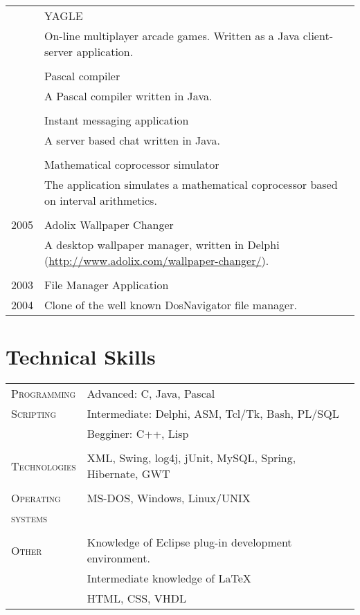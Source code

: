 \documentclass[a4paper,10pt]{article}
\begin{document}
\begin{longtable}{p{2.5cm}|p{11cm}}
 & YAGLE \\ & \footnotesize{On-line multiplayer arcade games. Written as a Java
 client-server application.} \\ 
 \multicolumn{2}{c}{} \\
 & Pascal compiler \\ & \footnotesize{A Pascal compiler written in Java.} \\
 \multicolumn{2}{c}{} \\
 & Instant messaging application \\ & \footnotesize{A server based chat written
 in Java.} \\
 \multicolumn{2}{c}{} \\
 & Mathematical coprocessor simulator \\ & \footnotesize{The application
 simulates a mathematical coprocessor based on interval arithmetics.} \\
 \multicolumn{2}{c}{} \\
 \raggedleft \textsc{2005} & Adolix Wallpaper Changer \\ & \footnotesize{A
 desktop wallpaper manager, written in Delphi
 (\href{http://www.adolix.com/wallpaper-changer/}{http://www.adolix.com/wallpaper-changer/}).} \\
 \multicolumn{2}{c}{} \\
  \raggedleft \textsc{2003} & File Manager Application \\
  \raggedleft \textsc{2004} & \footnotesize{Clone of the well known
DosNavigator file manager.} \\
\end{longtable}

\section{Technical Skills}
\begin{tabular}{p{2.5cm}p{11cm}}
\textsc{Programming} & Advanced: C, Java, Pascal \\
\textsc{Scripting} & Intermediate: Delphi, ASM, Tcl/Tk, Bash, PL/SQL \\
& Begginer: C++, Lisp \\
 \multicolumn{2}{c}{} \\ 
 \textsc{Technologies} & XML, Swing, log4j, jUnit, MySQL, Spring, Hibernate, GWT
 \\ \multicolumn{2}{c}{} \\
 \textsc{Operating} & MS-DOS, Windows, Linux/UNIX\\
 \textsc{systems}&\\ 
 \multicolumn{2}{c}{} \\
 \textsc{Other} & Knowledge of Eclipse plug-in development environment. \\
 & Intermediate knowledge of \LaTeX \\
 & HTML, CSS, VHDL\\
\end{tabular}
\end{document}
